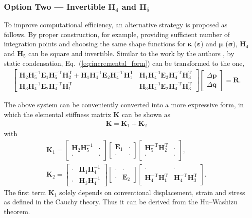 \documentclass[3p,sort&compress,11pt,fleqn,review]{elsarticle}
\newcommand*{\eqsref}[1]{Eq.~(\ref{#1})}
\newcommand*{\mb}[1]{\boldsymbol{#1}}
\newcommand*{\mT}{\mathrm{T}}
\begin{document}
\subsubsection{Option Two --- Invertible $\mb{H}_4$ and $\mb{H}_5$}
To improve computational efficiency, an alternative strategy is proposed as follows. By proper construction, for example, providing sufficient number of integration points and choosing the same shape functions for $\mb{\kappa}$ ($\mb{\varepsilon}$) and $\mb{\mu}$ ($\mb{\sigma}$), $\mb{H}_4$ and $\mb{H}_5$ can be square and invertible. Similar to the work by the authors \citep{Chang2019}, by static condensation, \eqsref{eq:incremental_form} can be transformed to the one,
\begin{gather}
\begin{bmatrix}
\mb{H}_2\mb{H}_5^{-1}\mb{E}_1\mb{H}_5^{-\mT}\mb{H}_2^\mT+\mb{H}_1\mb{H}_4^{-1}\mb{E}_2\mb{H}_4^{-\mT}\mb{H}_1^\mT&\mb{H}_1\mb{H}_4^{-1}\mb{E}_2\mb{H}_4^{-\mT}\mb{H}_3^\mT\\
\mb{H}_3\mb{H}_4^{-1}\mb{E}_2\mb{H}_4^{-\mT}\mb{H}_1^\mT&\mb{H}_3\mb{H}_4^{-1}\mb{E}_2\mb{H}_4^{-\mT}\mb{H}_3^\mT
\end{bmatrix}
\begin{bmatrix}
\Delta\mb{p}\\\Delta\mb{q}
\end{bmatrix}=\mb{R}.
\end{gather}

The above system can be conveniently converted into a more expressive form, in which the elemental stiffness matrix $\mb{K}$ can be shown as
\begin{gather}\label{eq:stiffness}
\mb{K}=\mb{K}_1+\mb{K}_2
\end{gather}
with
\begin{gather}
\mb{K}_1=\begin{bmatrix}
\mb{H}_2\mb{H}_5^{-1}&\cdot\\\cdot&\cdot
\end{bmatrix}\begin{bmatrix}
\mb{E}_1&\cdot\\\cdot&\cdot
\end{bmatrix}\begin{bmatrix}
\mb{H}_5^{-\mT}\mb{H}_2^\mT&\cdot\\\cdot&\cdot
\end{bmatrix},\\
\mb{K}_2=\begin{bmatrix}
\cdot&\mb{H}_1\mb{H}_4^{-1}\\\cdot&\mb{H}_3\mb{H}_4^{-1}
\end{bmatrix}\begin{bmatrix}
\cdot&\cdot\\\cdot&\mb{E}_2
\end{bmatrix}\begin{bmatrix}
\cdot&\cdot\\\mb{H}_4^{-\mT}\mb{H}_1^\mT&\mb{H}_4^{-\mT}\mb{H}_3^\mT
\end{bmatrix}.
\end{gather}
The first term $\mb{K}_1$ solely depends on conventional displacement, strain and stress as defined in the Cauchy theory. Thus it can be derived from the Hu--Washizu theorem.
\end{document}
